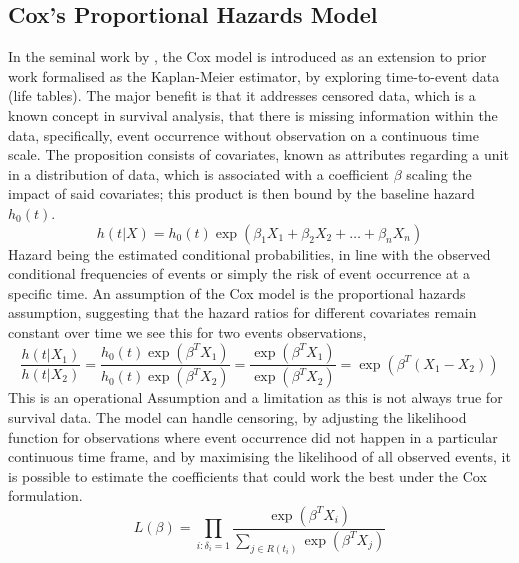 \subsection{Cox's Proportional Hazards Model}

\noindent In the seminal work by \parencite{cox_regression_1972}, the Cox model is introduced as an extension to prior work formalised as the Kaplan-Meier estimator, by exploring time-to-event data (life tables). The major benefit is that it addresses censored data, which is a known concept in survival analysis, that there is missing information within the data, specifically, event occurrence without observation on a continuous time scale. The proposition consists of covariates, known as attributes regarding a unit in a distribution of data, which is associated with a coefficient \(\beta\) scaling the impact of said covariates; this product is then bound by the baseline hazard \(h_{0}(t)\).
\begin{equation} \label{eq:cox}h(t|X) = h_0(t) \exp(\beta_1 X_1 + \beta_2 X_2 + \ldots + \beta_n X_n)\end{equation}
\noindent Hazard being the estimated conditional probabilities, in line with the observed conditional frequencies of events or simply the risk of event occurrence at a specific time. An assumption of the Cox model is the proportional hazards assumption, suggesting that the hazard ratios for different covariates remain constant over time we see this for two events observations,
\begin{equation} \label{eq:coxph}\frac{h(t|X_1)}{h(t|X_2)} = \frac{h_0(t) \exp(\beta^T X_1)}{h_0(t) \exp(\beta^T X_2)} = \frac{\exp(\beta^T X_1)}{\exp(\beta^T X_2)} = \exp(\beta^T (X_1 - X_2))\end{equation}
\noindent This is an operational Assumption and a limitation as this is not always true for survival data. The model can handle censoring, by adjusting the likelihood function for observations where event occurrence did not happen in a particular continuous time frame, and by maximising the likelihood of all observed events, it is possible to estimate the coefficients that could work the best under the Cox formulation.
\begin{equation} \label{eq:coxlikely}L(\beta) = \prod_{i: \delta_i = 1} \frac{\exp(\beta^T X_i)}{\sum_{j \in R(t_i)} \exp(\beta^T X_j)}\end{equation}

